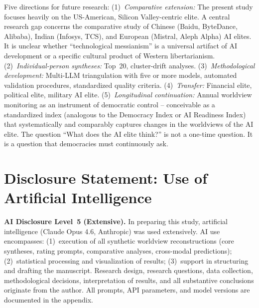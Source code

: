 \documentclass[12pt,a4paper]{article}
\begin{document}
Five directions for future research: (1)~\emph{Comparative extension:} The present study focuses heavily on the US-American, Silicon Valley-centric elite. A central research gap concerns the comparative study of Chinese (Baidu, ByteDance, Alibaba), Indian (Infosys, TCS), and European (Mistral, Aleph Alpha) AI elites. It is unclear whether ``technological messianism'' is a universal artifact of AI development or a specific cultural product of Western libertarianism. (2)~\emph{Individual-person syntheses:} Top~20, cluster-drift analyses. (3)~\emph{Methodological development:} Multi-LLM triangulation with five or more models, automated validation procedures, standardized quality criteria. (4)~\emph{Transfer:} Financial elite, political elite, military AI elite. (5)~\emph{Longitudinal continuation:} Annual worldview monitoring as an instrument of democratic control -- conceivable as a standardized index (analogous to the Democracy Index or AI Readiness Index) that systematically and comparably captures changes in the worldviews of the AI elite. The question ``What does the AI elite think?'' is not a one-time question. It is a question that democracies must continuously ask.


\section*{Disclosure Statement: Use of Artificial Intelligence}

\noindent\textbf{AI Disclosure Level~5 (Extensive).}
In preparing this study, artificial intelligence (Claude Opus 4.6, Anthropic) was used extensively. AI use encompasses: (1)~execution of all synthetic worldview reconstructions (core syntheses, rating prompts, comparative analyses, cross-modal predictions); (2)~statistical processing and visualization of results; (3)~support in structuring and drafting the manuscript. Research design, research questions, data collection, methodological decisions, interpretation of results, and all substantive conclusions originate from the author. All prompts, API parameters, and model versions are documented in the appendix.



\end{document}
